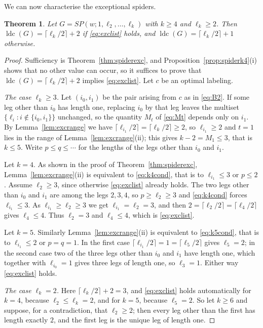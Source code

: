 \documentclass[reqno,10pt]{article}
\newtheorem{theorem}{Theorem}
\theoremstyle{definition}
\numberwithin{equation}{section}
\numberwithin{theorem}{section}
\newcommand{\ldc}{\operatorname{ldc}}
\newcommand{\Ntwo}{M}
\begin{document}
We can now characterise the exceptional spiders.

\begin{theorem}
\label{thm:spiderfull}
Let $G=SP(w;1,\ell_2,\dots,\ell_k)$ with $k\ge4$ and $\ell_k\ge2$. Then
$\ldc(G)=\lceil \ell_k/2\rceil+2$ if \eqref{eq:exclist} holds, and
$\ldc(G)=\lceil \ell_k/2\rceil+1$ otherwise.
\end{theorem}

\begin{proof}
Sufficiency is Theorem~\ref{thm:spiderexc}, and
Proposition~\ref{prop:spiderk4}(i) shows that no other value can occur, so it
suffices to prove that $\ldc(G)=\lceil \ell_k/2\rceil+2$ implies
\eqref{eq:exclist}. Let $c$ be an optimal labeling.

\smallskip
\noindent\emph{The case $\ell_k\ge3$.} Let $(i_0,i_1)$ be the pair arising from
$c$ as in \eqref{eq:B2}. If some leg other than $i_0$ has length one, replacing
$i_0$ by that leg leaves the multiset $\{\ell_i : i\notin\{i_0,i_1\}\}$
unchanged, so the quantity $\Ntwo_t$ of \eqref{eq:Mt} depends only on $i_1$. By
Lemma~\ref{lem:excrange} we have
$\lceil \ell_{i_1}/2\rceil=\lceil \ell_k/2\rceil\ge2$, so $\ell_{i_1}\ge2$ and
$t=1$ lies in the range of Lemma~\ref{lem:excrange}(ii); this gives
$k-2=\Ntwo_1\le3$, that is $k\le5$. Write $p\le q\le\cdots$ for the lengths of the
legs other than $i_0$ and $i_1$.

\smallskip
\noindent Let $k=4$. As shown in the proof of Theorem~\ref{thm:spiderexc},
Lemma~\ref{lem:excrange}(ii) is equivalent to \eqref{eq:k4cond}, that is to
$\ell_{i_1}\le3$ or $p\le2$. Assume $\ell_2\ge3$, since otherwise
\eqref{eq:exclist} already holds. The two legs other than $i_0$ and $i_1$ are
among the legs $2,3,4$, so $p\ge \ell_2\ge3$ and \eqref{eq:k4cond} forces
$\ell_{i_1}\le3$. As $\ell_{i_1}\ge \ell_2\ge3$ we get
$\ell_{i_1}=\ell_2=3$, and then $2=\lceil \ell_2/2\rceil=\lceil \ell_4/2\rceil$
gives $\ell_4\le4$. Thus $\ell_2=3$ and $\ell_4\le4$, which is
\eqref{eq:exclist}.

\smallskip
\noindent Let $k=5$. Similarly Lemma~\ref{lem:excrange}(ii) is equivalent to
\eqref{eq:k5cond}, that is to $\ell_{i_1}\le2$ or $p=q=1$. In the first case
$\lceil \ell_{i_1}/2\rceil=1=\lceil \ell_5/2\rceil$ gives $\ell_5=2$; in the
second case two of the three legs other than $i_0$ and $i_1$ have length one,
which together with $\ell_{i_0}=1$ gives three legs of length one, so
$\ell_3=1$. Either way \eqref{eq:exclist} holds.

\smallskip
\noindent\emph{The case $\ell_k=2$.} Here $\lceil \ell_k/2\rceil+2=3$, and
\eqref{eq:exclist} holds automatically for $k=4$, because $\ell_2\le \ell_k=2$,
and for $k=5$, because $\ell_5=2$. So let $k\ge6$ and suppose, for a
contradiction, that $\ell_2\ge2$; then every leg other than the first has length
exactly $2$, and the first leg is the unique leg of length one.


\end{proof}
\end{document}
